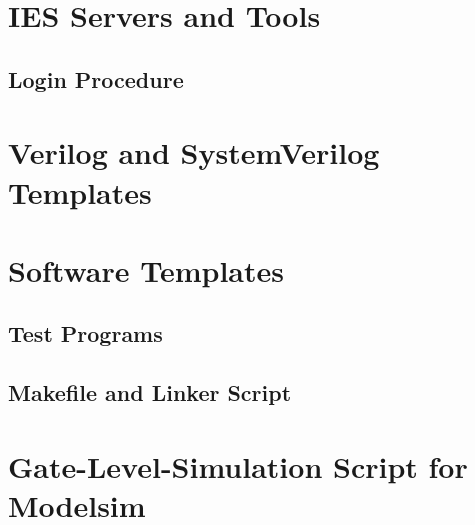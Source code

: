 
\newpage
\begin{appendix}
\section{IES Servers and Tools}
\subsection{Login Procedure}




\newpage
\section{Verilog and SystemVerilog Templates}

\newpage

\newpage


\newpage
\section{Software Templates}
\subsection{Test Programs}
\label{c:count32}
\label{c:count32.dasm}\newpage
\label{c:count32.bin}\newpage
\label{c:count32.gold}\newpage
\newpage
\label{c:memcpy46}
\label{c:memcpy46.dasm}

\newpage
\subsection{Makefile and Linker Script}
\label{makefile}
\label{linkerscript}


\newpage
\section{Gate-Level-Simulation Script for Modelsim}
\label{tut:gls}

\end{appendix}

